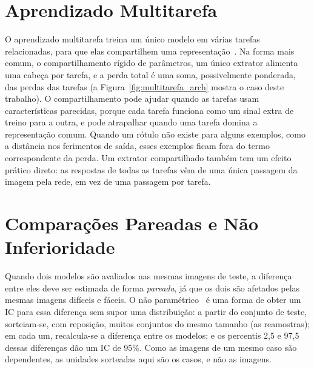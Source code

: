 \section{Aprendizado Multitarefa}
\label{sec:mt_background}

O aprendizado multitarefa treina um único modelo em várias tarefas relacionadas, para que elas compartilhem uma representação~\cite{caruana1997multitask,ruder2017overview}. Na forma mais comum, o compartilhamento rígido de parâmetros, um único extrator alimenta uma cabeça por tarefa, e a perda total é uma soma, possivelmente ponderada, das perdas das tarefas (a Figura~\ref{fig:multitarefa_arch} mostra o caso deste trabalho). O compartilhamento pode ajudar quando as tarefas usam características parecidas, porque cada tarefa funciona como um sinal extra de treino para a outra, e pode atrapalhar quando uma tarefa domina a representação comum. Quando um rótulo não existe para alguns exemplos, como a distância nos ferimentos de saída, esses exemplos ficam fora do termo correspondente da perda. Um extrator compartilhado também tem um efeito prático direto: as respostas de todas as tarefas vêm de uma única passagem da imagem pela rede, em vez de uma passagem por tarefa.

\section{Comparações Pareadas e Não Inferioridade}
\label{sec:stats_background}

Quando dois modelos são avaliados nas mesmas imagens de teste, a diferença entre eles deve ser estimada de forma \emph{pareada}, já que os dois são afetados pelas mesmas imagens difíceis e fáceis. O  não paramétrico~\cite{efron1993bootstrap} é uma forma de obter um \gls{IC} para essa diferença sem supor uma distribuição: a partir do conjunto de teste, sorteiam-se, com reposição, muitos conjuntos do mesmo tamanho (as reamostras); em cada um, recalcula-se a diferença entre os modelos; e os percentis 2,5 e 97,5 dessas diferenças dão um IC de 95\%. Como as imagens de um mesmo caso são dependentes, as unidades sorteadas aqui são os casos, e não as imagens.

